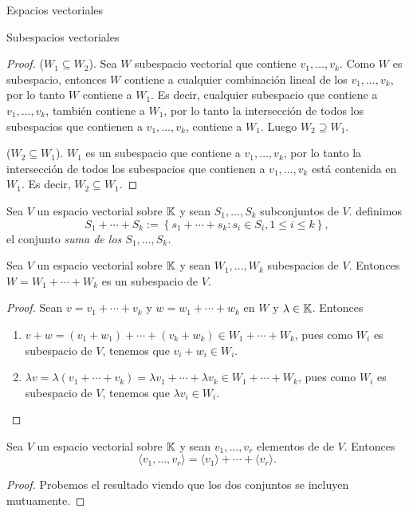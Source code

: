\begin{chapter}{Espacios vectoriales}
\begin{section}{Subespacios vectoriales}
\begin{proof}
        ($W_1 \subseteq W_2$). Sea $W$  subespacio vectorial que contiene $v_1,\ldots,v_k$. Como $W$ es subespacio,  entonces  $W$ contiene a cualquier combinación lineal de los $v_1,\ldots,v_k$, por lo tanto $W$ contiene a $W_1$. Es decir, cualquier subespacio que contiene a $v_1,\ldots,v_k$,  también contiene a  $W_1$, por lo tanto la intersección de todos los subespacios que  contienen a $v_1,\ldots,v_k$, contiene a $W_1$. Luego $W_2 \supseteq W_1$.
        
        ($W_2 \subseteq W_1$). $W_1$ es un subespacio que contiene a $v_1,\ldots,v_k$, por lo tanto  la intersección de todos los subespacios que  contienen a $v_1,\ldots,v_k$  está contenida en $W_1$. Es decir, $W_2 \subseteq W_1$.
    \end{proof}
        
        
    \begin{definicion} Sea $V$ un espacio vectorial sobre $\mathbb K$ y sean $S_1,\ldots,S_k$ subconjuntos  de $V$.
        definimos 
        \begin{equation*}
            S_1+  \cdots +S_k := \left\{s_1+\cdots+s_k: s_i \in S_i, 1 \le i \le k \right\},
        \end{equation*}
        el conjunto \textit{suma de los  $S_1,\ldots,S_k$.}
    \end{definicion}	

    \begin{teorema}
         Sea $V$ un espacio vectorial sobre $\mathbb K$ y sean $W_1,\ldots,W_k$ subespacios  de $V$. Entonces $W= W_1+\cdots+W_k$ es un subespacio de $V$.
    \end{teorema}
    \begin{proof}
        Sean $v = v_1+\cdots+v_k$ y $w = w_1+\cdots+w_k$ en $W$ y $\lambda \in \mathbb K$. Entonces
        \begin{enumerate}[label=(\alph*),ref=\alph*]
            \item $v+w =  (v_1+w_1)+\cdots+(v_k+w_k) \in W_1+\cdots+W_k$, pues como $W_i$ es subespacio de $V$, tenemos que $v_i+w_i \in W_i$.
            \item  $\lambda v = \lambda(v_1+\cdots+v_k) = \lambda v_1+\cdots+\lambda v_k \in W_1+\cdots+W_k$, pues como $W_i$ es subespacio de $V$, tenemos que $\lambda v_i \in W_i$.
        \end{enumerate}
    \end{proof}

    \begin{proposicion}
        Sea $V$ un espacio vectorial sobre $\mathbb K$ y sean $v_1,\ldots,v_r$ elementos de   de $V$. Entonces
        \begin{equation*}
            \langle v_1,\ldots,v_r \rangle = \langle v_1 \rangle+ \cdots + \langle v_r \rangle.
        \end{equation*}
    \end{proposicion}
    \begin{proof}
        Probemos el resultado viendo que los dos conjuntos se incluyen mutuamente.
        

\end{proof}
\end{section}
\end{chapter}
